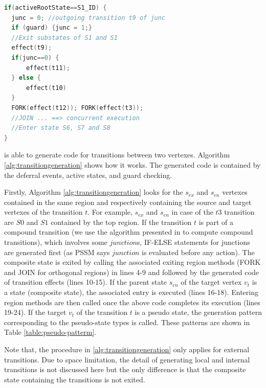 \begin{lstlisting}[caption=Example code generated for $Fork1$ and $junc$, label=lst:event1, language=C++,frame=none,float]
if(activeRootState==S1_ID) {
  junc = 0; //outgoing transition t9 of junc
  if (guard) {junc = 1;}
  //Exit substates of S1 and S1
  effect(t9);
  if(junc==0) {
	  effect(t11);
  } else {
	  effect(t10)
  }
  FORK(effect(t12)); FORK(effect(t3)); 
  //JOIN ... ==> concurrent execution
  //Enter state S6, S7 and S8
}
\end{lstlisting}


 is able to generate code for transitions between two vertexes. 
Algorithm \ref{alg:transitiongeneration} shows how it works. 
The generated code is contained by the deferral events, active states, and guard checking.

Firstly, Algorithm \ref{alg:transitiongeneration} looks for the $s_{ex}$ and $s_{en}$ vertexes contained in the same region and respectively containing the source and target vertexes of the transition $t$.
For example, $s_{ex}$ and $s_{en}$ in case of the $t3$ transition are $S0$ and $S1$ contained by the top region.
If the transition $t$ is part of a compound transition (we use the algorithm presented in \cite{balser2004interactive,Knapp2004} to compute compound transitions), which involves some $junction$s, IF-ELSE statements for junctions are generated first (as PSSM says $junction$ is evaluated before any action). 
The composite state is exited by calling the associated exiting region methods (FORK and JOIN for orthogonal regions) in lines 4-9 and followed by the generated code of transition effects (lines 10-15). 
If the parent state $s_{en}$ of the target vertex $v_t$ is a state (composite state), the associated entry is executed (lines 16-18).
Entering region methods are then called once the above code completes its execution (lines 19-24). 
If the target $v_t$ of the transition $t$ is a pseudo state, the generation pattern corresponding to the pseudo-state types is called. These patterns are shown in Table \ref{table:pseudo-patterm}.

Note that, the procedure in \ref{alg:transitiongeneration} only applies for external transitions. Due to space limitation, the detail of generating local and internal transitions is not discussed here but the only difference is that the composite state containing the transitions is not exited.


